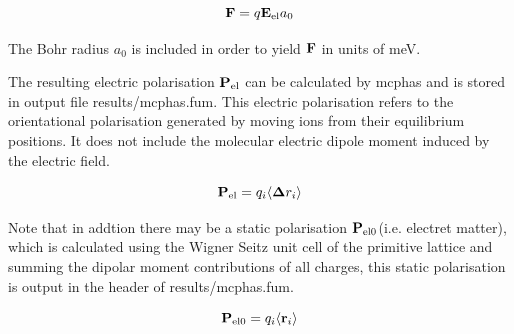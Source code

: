 \begin{equation}
\mathbf F = q \mathbf E_{\rm el} a_0
\end{equation}

The Bohr radius $a_0$ is included in order to yield $\mathbf F$ in units of meV.

The resulting electric polarisation $\mathbf P_{\rm el}$ can be calculated by {\prg mcphas}
and is stored in output file {\prg results/mcphas.fum}. This electric polarisation refers to
the orientational polarisation generated by moving ions from their equilibrium positions. It does
not include the molecular electric dipole moment induced by the electric field.

\begin{equation}
\mathbf P_{\rm el} = q_i  \langle \mathbf \Delta r_i \rangle 
\end{equation}

Note that in addtion there may be a static polarisation $\mathbf P_{\rm el0}$(i.e. electret matter), which is calculated using
the Wigner Seitz unit cell of the primitive lattice and summing the dipolar moment contributions
of all charges, this static polarisation is output in the header of {\prg results/mcphas.fum}.

\begin{equation}
\mathbf P_{\rm el0} = q_i  \langle \mathbf r_i \rangle 
\end{equation}



